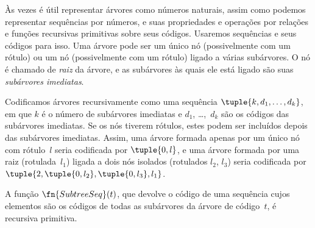 \documentclass[../../../include/open-logic-section]{subfiles}
\begin{document}

Às vezes é útil representar árvores como números naturais, assim como
podemos representar sequências por números, e suas propriedades e
operações por relações e funções recursivas primitivas sobre seus
códigos. Usaremos sequências e seus códigos para isso. Uma árvore pode
ser um único nó (possivelmente com um rótulo) ou um nó (possivelmente
com um rótulo) ligado a várias subárvores. O nó é chamado de
\emph{raiz} da árvore, e as subárvores às quais ele está ligado são
suas \emph{subárvores imediatas}.

Codificamos árvores recursivamente como uma sequência
$\tuple{k, d_1, \dots, d_k}$, em que $k$ é o número de subárvores
imediatas e $d_1$, \dots,~$d_k$ são os códigos das subárvores imediatas.
Se os nós tiverem rótulos, estes podem ser incluídos depois das
subárvores imediatas. Assim, uma árvore formada apenas por um único nó
com rótulo~$l$ seria codificada por $\tuple{0,l}$, e uma árvore formada
por uma raiz (rotulada~$l_1$) ligada a dois nós isolados (rotulados
$l_2$, $l_3$) seria codificada por $\tuple{2,
  \tuple{0, l_2}, \tuple{0, l_3}, l_1}$.

\begin{prop}
  A função $\fn{SubtreeSeq}(t)$, que devolve o código de uma
  sequência cujos elementos são os códigos de todas as subárvores da
  árvore de código~$t$, é recursiva primitiva.
\end{prop}
\end{document}
